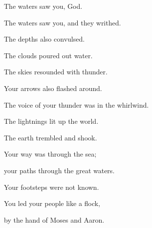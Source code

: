 {\Q {}The waters saw you, God.
\par }{\QB The waters saw you, and they writhed.
\par }{\QB The depths also convulsed.
\par }{\Q {}The clouds poured out water.
\par }{\QB The skies resounded with thunder.
\par }{\QB Your arrows also flashed around.
\par }{\Q {}The voice of your thunder was in the whirlwind.
\par }{\QB The lightnings lit up the world.
\par }{\QB The earth trembled and shook.
\par }{\Q {}Your way was through the sea;
\par }{\QB your paths through the great waters.
\par }{\QB Your footsteps were not known.
\par }{\Q {}You led your people like a flock,
\par }{\QB by the hand of Moses and Aaron.
\par }{\BB \par }
